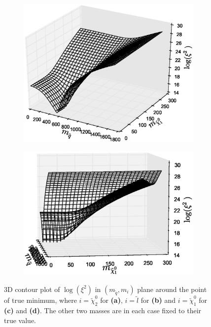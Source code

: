 \documentclass[twoside,english]{uiofysmaster}
\begin{document}
\begin{figure}[hbt]
	\begin{subfigure}[b]{0.49\textwidth}
		\includegraphics[width=\textwidth,clip=true,trim=60 40 50 40]{figures/webber_rec_table/xisq_surface_herwigpp_squarkneutralino1.eps} 
		\caption{}
		\label{fig:3D_masses3}
	\end{subfigure}
	\begin{subfigure}[b]{0.49\textwidth}
		\includegraphics[width=\textwidth,clip=true,trim=70 50 50 50]{figures/webber_rec_table/xisq_surface_herwigpp_squarkneutralino1-rotated.eps} 
		\caption{}
		\label{fig:3D_masses4}
	\end{subfigure}
	\caption{3D contour plot of $\log(\xi^2)$ in $(m_{\tilde q},m_i)$ plane around the point of true minimum, where $i=\tilde \chi_2^0$ for {\bf (a)}, $i=\tilde l$ for {\bf (b)} and $i=\tilde \chi_1^0$ for {\bf (c)} and {\bf (d)}. The other two masses are in each case fixed to their true value.}
	\label{fig:3D_masses}
\end{figure}
\end{document}
